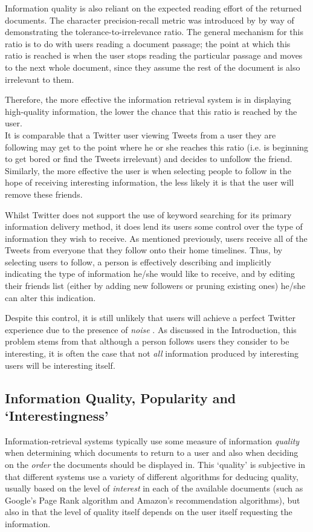 Information quality is also reliant on the expected reading effort of the returned documents. The character precision-recall metric was introduced by \cite{arvola10} by way of demonstrating the tolerance-to-irrelevance ratio. The general mechanism for this ratio is to do with users reading a document passage; the point at which this ratio is reached is when the user stops reading the particular passage and moves to the next whole document, since they assume the rest of the document is also irrelevant to them.

Therefore, the more effective the information retrieval system is in displaying high-quality information, the lower the chance that this ratio is reached by the user.\\ 
It is comparable that a Twitter user viewing Tweets from a user they are following may get to the point where he or she reaches this ratio (i.e. is beginning to get bored or find the Tweets irrelevant) and decides to unfollow the friend. Similarly, the more effective the user is when selecting people to follow in the hope of receiving interesting information, the less likely it is that the user will remove these friends.

Whilst Twitter does not support the use of keyword searching for its primary information delivery method, it does lend its users some control over the type of information they wish to receive. As mentioned previously, users receive all of the Tweets from everyone that they follow onto their home timelines. Thus, by selecting users to follow, a person is effectively describing and implicitly indicating the type of information he/she would like to receive, and by editing their friends list (either by adding new followers or pruning existing ones) he/she can alter this indication.

Despite this control, it is still unlikely that users will achieve a perfect Twitter experience due to the presence of \textit{noise} \cite{alonso10}. As discussed in the Introduction, this problem stems from that although a person follows users they consider to be interesting, it is often the case that not \textit{all} information produced by interesting users will be interesting itself.


\subsection{Information Quality, Popularity and `Interestingness'}
Information-retrieval systems typically use some measure of information \textit{quality} when determining which documents to return to a user and also when deciding on the \textit{order} the documents should be displayed in. This `quality' is subjective in that different systems use a variety of different algorithms for deducing quality, usually based on the level of \textit{interest} in each of the available documents (such as Google's Page Rank algorithm and Amazon's recommendation algorithms), but also in that the level of quality itself depends on the user itself requesting the information. 

